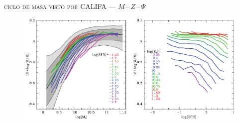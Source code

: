 \documentclass[xcolor=dvipsnames,fleqn,hyperref={colorlinks,citecolor=black,linkcolor=black,urlcolor=black}]{beamer}
\begin{document}
\begin{frame}{\textsc{ciclo de masa visto por CALIFA --- $M\,$--$\,Z\,$--$\,\Psi$}}

\begin{figure}
\includegraphics[scale=1]{img/mannucci2010-1}
\end{figure}
\end{frame}
\end{document}

